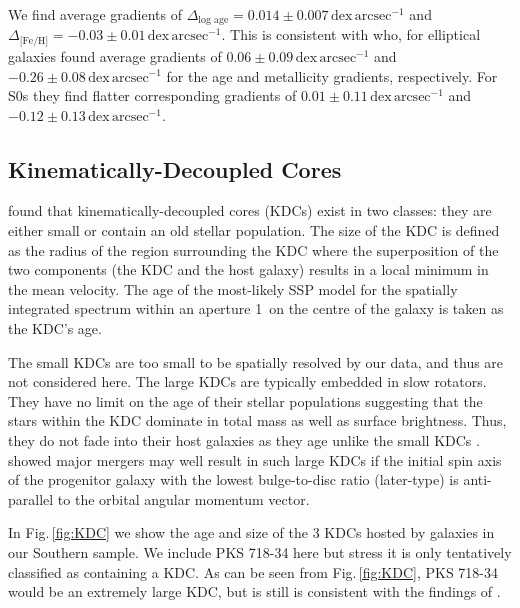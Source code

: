 \documentclass[a4paper,fleqn,usenatbib]{mnras}
\begin{document}
		We find average gradients of $\Delta_\text{log age} = 0.014\pm0.007 \,\mathrm{dex \, arcsec^{-1}}$ and $\Delta_\text{[Fe/H]} = -0.03\pm0.01 \, \mathrm{dex \, arcsec^{-1}}$. This is consistent with \citet{Koleva2011} who, for elliptical galaxies found average gradients of $0.06\pm0.09 \, \mathrm{dex \, arcsec^{-1}}$ and $-0.26\pm0.08 \, \mathrm{dex \, arcsec^{-1}}$ for the age and metallicity gradients, respectively. For S0s they find flatter corresponding gradients of $0.01\pm0.11\, \mathrm{dex \, arcsec^{-1}}$ and $-0.12\pm0.13\, \mathrm{dex \, arcsec^{-1}}$. 

	\subsection{Kinematically-Decoupled Cores}
		\label{subsec:popKDC}
		\citet{Kuntschner2010} found that kinematically-decoupled cores (KDCs) exist in two classes: they are either small or contain an old stellar population. The size of the KDC is defined as the radius of the region surrounding the KDC where the superposition of the two components (the KDC and the host galaxy) results in a local minimum in the mean velocity. The age of the most-likely SSP model for the spatially integrated spectrum within an aperture 1\arcsec\ on the centre of the galaxy is taken as the KDC's age.

		The small KDCs are too small to be spatially resolved by our data, and thus are not considered here. The large KDCs are typically embedded in slow rotators. They have no limit on the age of their stellar populations suggesting that the stars within the KDC dominate in total mass as well as surface brightness. Thus, they do not fade into their host galaxies as they age unlike the small KDCs \citep{Kuntschner2010}. \citet{Bois2011} showed major mergers may well result in such large KDCs if the initial spin axis of the progenitor galaxy with the lowest bulge-to-disc ratio (later-type) is anti-parallel to the orbital angular momentum vector. 

		In Fig.\,\ref{fig:KDC} we show the age and size of the 3 KDCs hosted by galaxies in our Southern sample. We include PKS 718-34 here but stress it is only tentatively classified as containing a KDC. As can be seen from Fig.\,\ref{fig:KDC}, PKS 718-34 would be an extremely large KDC, but is still is consistent with the findings of \citet{Kuntschner2010}.
\end{document}
